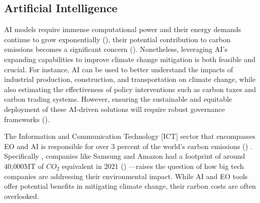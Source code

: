 \documentclass[12pt]{article}
\begin{document}
\subsection*{Artificial Intelligence}
AI models require immense computational power and their energy demands continue to grow exponentially (\cite{amodei_2018}),
 their potential contribution to carbon emissions becomes a significant concern (\cite{taddeo_2021}). Nonetheless, leveraging AI’s 
 expanding capabilities to improve climate change mitigation is both feasible and crucial. 
 For instance, AI can be used to better understand the impacts of industrial production, construction, 
 and transportation on climate change, while also estimating the effectiveness of policy interventions such 
 as carbon taxes and carbon trading systems. However, ensuring the sustainable and equitable deployment of these 
 AI-driven solutions will require robust governance frameworks (\cite{taddeo_2021}).

 The  Information and Communication Technology [ICT] sector that encompasses EO and AI
is responsible for over 3 percent of the world's carbon emissions (\cite{jones_2018}) . Specifically , 
companies like Samsung and Amazon had a footprint of around 40,000MT of \(CO_2\) equivalent in 2021 (\cite{navarro_2023_the}) —raises the question 
of how big tech companies are addressing their environmental impact. While AI and EO tools offer potential benefits in 
mitigating climate change, their carbon costs are often overlooked.

\end{document}
